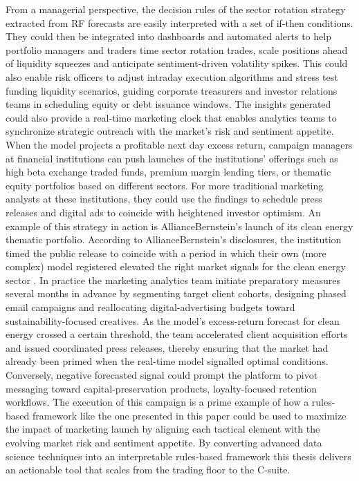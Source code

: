 From a managerial perspective, the decision rules of the sector rotation strategy extracted from RF forecasts are easily interpreted with a set of if-then conditions. They could then be integrated into dashboards and automated alerts to help portfolio managers and traders time sector rotation trades, scale positions ahead of liquidity squeezes and anticipate sentiment-driven volatility spikes. This could also enable risk officers to adjust intraday execution algorithms and stress test funding liquidity scenarios, guiding corporate treasurers and investor relations teams in scheduling equity or debt issuance windows. The insights generated could also provide a real-time marketing clock that enables analytics teams to synchronize strategic outreach with the market's risk and sentiment appetite. When the model projects a profitable next day excess return, campaign managers at financial institutions can push launches of the institutions' offerings such as high beta exchange traded funds, premium margin lending tiers, or thematic equity portfolios based on different sectors. For more traditional marketing analysts at these institutions, they could use the findings to schedule press releases and digital ads to coincide with heightened investor optimism. An example of this strategy in action is AllianceBernstein's launch of its clean energy thematic portfolio. According to AllianceBernstein's disclosures, the institution timed the public release to coincide with a period in which their own (more complex) model registered elevated the right market signals for the clean energy sector \cite{alliance_2024}. In practice the marketing analytics team initiate preparatory measures several months in advance by segmenting target client cohorts, designing phased email campaigns and reallocating digital-advertising budgets toward sustainability-focused creatives. As the model's excess-return forecast for clean energy crossed a certain threshold, the team accelerated client acquisition efforts and issued coordinated press releases, thereby ensuring that the market had already been primed when the real-time model signalled optimal conditions. Conversely, negative forecasted signal could prompt the platform to pivot messaging toward capital-preservation products, loyalty-focused retention workflows. The execution of this campaign is a prime example of how a rules-based framework like the one presented in this paper could be used to maximize the impact of marketing launch by aligning each tactical element with the evolving market risk and sentiment appetite. By converting advanced data science techniques into an interpretable rules-based framework this thesis delivers an actionable tool that scales from the trading floor to the C-suite.

